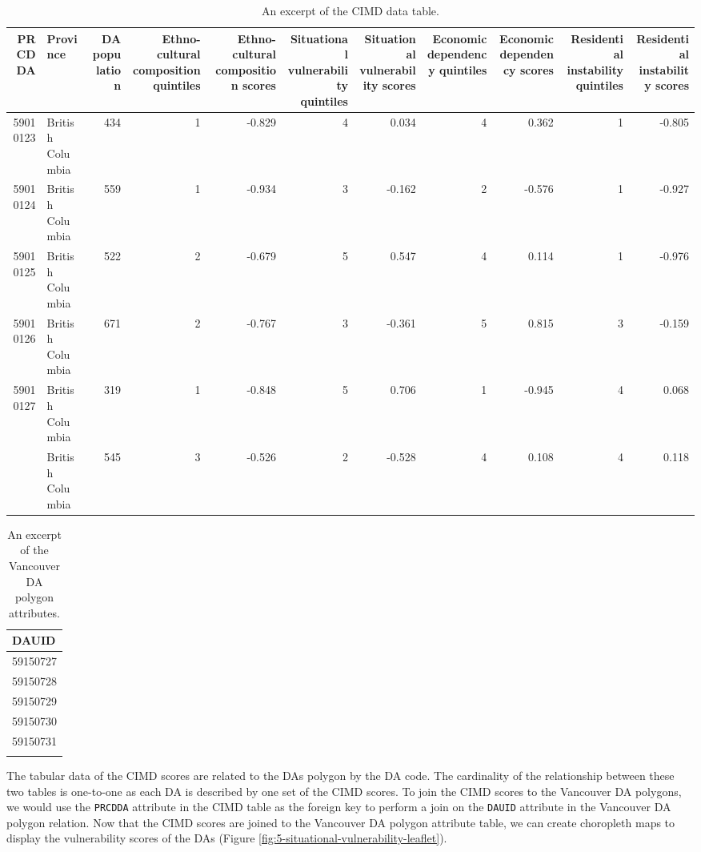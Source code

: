 \documentclass[
]{book}
\begin{document}
\begin{table}

\caption{\label{tab:5-case-join}An excerpt of the CIMD data table.}
\centering
\begin{tabular}[t]{rlrrrrrrrrr}
\toprule
PRCDDA & Province & DA population & Ethno-cultural composition quintiles & Ethno-cultural composition scores & Situational vulnerability quintiles & Situational vulnerability scores & Economic dependency quintiles & Economic dependency scores & Residential instability quintiles & Residential instability scores\\
\midrule
59010123 & British Columbia & 434 & 1 & -0.829 & 4 & 0.034 & 4 & 0.362 & 1 & -0.805\\
59010124 & British Columbia & 559 & 1 & -0.934 & 3 & -0.162 & 2 & -0.576 & 1 & -0.927\\
59010125 & British Columbia & 522 & 2 & -0.679 & 5 & 0.547 & 4 & 0.114 & 1 & -0.976\\
59010126 & British Columbia & 671 & 2 & -0.767 & 3 & -0.361 & 5 & 0.815 & 3 & -0.159\\
59010127 & British Columbia & 319 & 1 & -0.848 & 5 & 0.706 & 1 & -0.945 & 4 & 0.068\\
\addlinespace
59010128 & British Columbia & 545 & 3 & -0.526 & 2 & -0.528 & 4 & 0.108 & 4 & 0.118\\
\bottomrule
\end{tabular}
\end{table}

\begin{table}

\caption{\label{tab:5-case-study-2}An excerpt of the Vancouver DA polygon attributes.}
\centering
\begin{tabular}[t]{l}
\toprule
DAUID\\
\midrule
59150727\\
59150728\\
59150729\\
59150730\\
59150731\\
\addlinespace
59150732\\
\bottomrule
\end{tabular}
\end{table}

The tabular data of the CIMD scores are related to the DAs polygon by the DA code. The cardinality of the relationship between these two tables is one-to-one as each DA is described by one set of the CIMD scores. To join the CIMD scores to the Vancouver DA polygons, we would use the \texttt{PRCDDA} attribute in the CIMD table as the foreign key to perform a join on the \texttt{DAUID} attribute in the Vancouver DA polygon relation. Now that the CIMD scores are joined to the Vancouver DA polygon attribute table, we can create choropleth maps to display the vulnerability scores of the DAs (Figure \ref{fig:5-situational-vulnerability-leaflet}).
\end{document}
